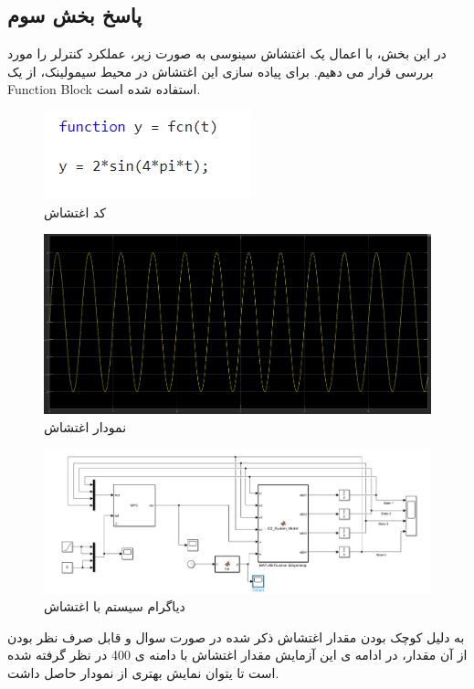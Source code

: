 \subsection*{پاسخ بخش سوم}
در این بخش، با اعمال یک اغتشاش سینوسی به صورت زیر، عملکرد کنترلر را مورد بررسی قرار می دهیم. برای پیاده سازی این اغتشاش در محیط سیمولینک، از یک Function Block استفاده شده است.
\begin{figure}
	\centering
	\includegraphics[width=0.7\linewidth]{../img/Q3_Disturbance}
	\caption{کد اغتشاش}
	\label{fig:q3disturbance}
\end{figure}
\begin{figure}
	\centering
	\includegraphics[width=0.7\linewidth]{../img/Q3_Disturbance_plot}
	\caption{نمودار اغتشاش}
	\label{fig:q3disturbanceplot}
\end{figure}
\begin{figure}
	\centering
	\includegraphics[width=1\linewidth]{../img/Q3_Diagram}
	\caption{دیاگرام سیستم با اغتشاش}
	\label{fig:q3diagram}
\end{figure}
به دلیل کوچک بودن مقدار اغتشاش ذکر شده در صورت سوال و قابل صرف نظر بودن از آن مقدار، در ادامه ی این آزمایش مقدار اغتشاش با دامنه ی 400 در نظر گرفته شده است تا یتوان نمایش بهتری از نمودار حاصل داشت.
